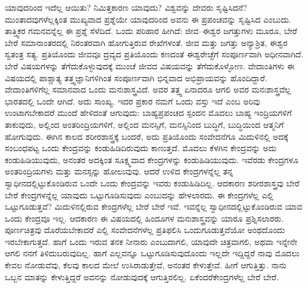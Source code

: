ಯಾವುದರಿಂದ ಇದೆಲ್ಲ ಆಯಿತು? ನಿಮಿತ್ತಕಾರಣ ಯಾವುದು? ವಿಶ್ವವನ್ನು ದೇವರು ಸೃಷ್ಟಿಸಿದನೆ? ಮುಂತಾದವುಗಳೆಲ್ಲಕ್ಕಿಂತ ಮುಖ್ಯವಾದ ಪ್ರಶ್ನೆಯೇ ಯಾವುದರಿಂದ ಅವನು ಈ ಪ್ರಪಂಚವನ್ನು ಸೃಷ್ಟಿಸಿದ ಎಂಬುದು. ತಾತ್ತ್ವಿಕರ ಗಮನವನ್ನೆಲ್ಲ ಈ ಪ್ರಶ್ನೆ ಸೆಳೆದಿದೆ. ಒಂದು ಪರಿಹಾರ ಹೀಗಿದೆ: ಜೀವ–ಈಶ್ವರ ಜಗತ್ತುಗಳು ಮೂರೂ, ಬೇರೆ ಬೇರೆ ಸಮಾನಾಂತರದಲ್ಲಿ ನಿರಂತರವಾಗಿ ಹೋಗುತ್ತಿರುವ ರೇಖೆಗಳಂತೆ. ಜೀವ ಮತ್ತು ಜಗತ್ತು ಅನ್ಯಾಶ್ರಿತ, ಈಶ್ವರ ಸ್ವತಂತ್ರ ಸತ್ಯ. ಪ್ರತಿಯೊಂದು ಜೀವವೂ ದ್ರವ್ಯದ ಪ್ರತಿಯೊಂದು ಕಣದಂತೆ ಈಶ್ವರೇಚ್ಛೆಗೆ ಸಂಪೂರ್ಣವಾಗಿ ಅಧೀನವಾಗಿದೆ. ಬೇರೆ ವಿಷಯಗಳನ್ನು ತೆಗೆದುಕೊಳ್ಳುವುದಕ್ಕೆ ಮುಂಚೆ ಜೀವದ ವಿಷಯವನ್ನು ತೆಗೆದುಕೊಳ್ಳೋಣ. ವೇದಾಂತಿಗಳು ಈ ವಿಷಯದಲ್ಲಿ ಪಾಶ್ಚಾತ್ಯ ತತ್ತ್ವಜ್ಞಾನಿಗಳಿಗಿಂತ ಸಂಪೂರ್ಣವಾಗಿ ಭಿನ್ನವಾದ ಅಭಿಪ್ರಾಯವನ್ನು ಹೊಂದಿದ್ದಾರೆ. ವೇದಾಂತಿಗಳಿಗೆಲ್ಲ ಸಮಾನವಾದ ಒಂದು ಮನಃಶಾಸ್ತ್ರವಿದೆ. ಅವರ ತತ್ತ್ವ ಏನಾದರೂ ಆಗಲಿ ಅವರ ಮನಃಶಾಸ್ತ್ರವೆಲ್ಲ ಭಾರತದಲ್ಲಿ ಒಂದೇ ಆಗಿದೆ. ಅದು ಸಾಂಖ್ಯ. ಇದರ ಪ್ರಕಾರ ನಮಗೆ ಒಂದು ವಸ್ತು ಇದೆ ಎಂಬ ಅರಿವು ಉಂಟಾಗಬೇಕಾದರೆ ಮುಂದೆ ಹೇಳಿದಂತೆ ಆಗುವುದು: ಬಾಹ್ಯಪ್ರಪಂಚದ ಸ್ಪಂದನ ಮೊದಲು ಬಾಹ್ಯ ಇಂದ್ರಿಯಗಳಿಗೆ ತಾಕುವುದು, ಅಲ್ಲಿಂದ ಅಂತರಿಂದ್ರಿಯಗಳಿಗೆ, ಅಲ್ಲಿಂದ ಮನಸ್ಸಿಗೆ, ಮನಸ್ಸಿನಿಂದ ಬುದ್ಧಿಗೆ, ಬುದ್ಧಿಯಿಂದ ಆತ್ಮನಿಗೆ ಹೋಗುವುದು. ಈಗಿನ ಕಾಲದ ಶರೀರಶಾಸ್ತ್ರಕ್ಕೆ ಬಂದರೆ, ಅದು ಪ್ರತಿಯೊಂದು ಸಂವೇದನೆಗೂ ಮಿದುಳಿನಲ್ಲಿ ಅದಕ್ಕೆ ಸಂಬಂಧಪಟ್ಟ ಒಂದು ಕೇಂದ್ರವನ್ನು ಕಂಡುಹಿಡಿದಿರುವುದು ಕಾಣುತ್ತದೆ. ಮೊದಲು ಕೆಳಗಿನ ಕೇಂದ್ರವನ್ನು ಅದು ಕಂಡುಹಿಡಿಯುವುದು, ಅನಂತರ ಅದಕ್ಕಿಂತ ಸೂಕ್ಷ್ಮವಾದ ಕೇಂದ್ರಗಳನ್ನು ಕಂಡುಹಿಡಿಯುವುದು. ಇವೆರಡು ಕೇಂದ್ರಗಳೂ ಅಂತರಿಂದ್ರಿಯಗಳು ಮತ್ತು ಮನಸ್ಸನ್ನು ಹೋಲುವುವು. ಆದರೆ ಉಳಿದ ಕೇಂದ್ರಗಳನ್ನೆಲ್ಲ ತನ್ನ ಸ್ವಾಧೀನದಲ್ಲಿಟ್ಟುಕೊಂಡಿರುವ ಒಂದೇ ಒಂದು ಕೇಂದ್ರವನ್ನು ಇವರು ಕಂಡುಹಿಡಿದಿಲ್ಲ. ಆದಕಾರಣ ಶರೀರಶಾಸ್ತ್ರವು ಬೇರೆ ಬೇರೆ ಕೇಂದ್ರಗಳನ್ನೆಲ್ಲ ಯಾವುದು ಒಟ್ಟುಗೂಡಿಸುವುದು ಎಂಬುದನ್ನು ಹೇಳಲಾರದು. ಈ ಕೇಂದ್ರಗಳೆಲ್ಲ ಎಲ್ಲಿ ಒಟ್ಟುಗೂಡುತ್ತವೆ? ಮಿದುಳಿನಲ್ಲಿರುವ ಕೇಂದ್ರಗಳೆಲ್ಲ ಬೇರೆ ಬೇರೆ ಇವೆ. ಇವನ್ನೆಲ್ಲ ಸ್ವಾಧೀನದಲ್ಲಿಟ್ಟುಕೊಂಡಿರುವ ಯಾವ ಒಂದು ಕೇಂದ್ರವೂ ಇಲ್ಲ. ಆದಕಾರಣ ಈ ವಿಷಯದಲ್ಲಿ ಹಿಂದೂಗಳ ಮನಃಶಾಸ್ತ್ರವನ್ನು ಯಾರೂ ಪ್ರಶ್ನಿಸಲಾರರು. ಪೂರ್ಣಚಿತ್ರವು ದೊರೆಯಬೇಕಾದರೆ ಎಲ್ಲಿ ಸಂವೇದನೆಗಳೆಲ್ಲ ಪ್ರತಿಫಲಿಸಿ ಒಂದುಗೂಡುತ್ತವೆಯೋ ಅಂಥದೊಂದು ಇರಬೇಕಾಗುತ್ತದೆ. ಹಾಗೆ ಒಂದು ಇರುವ ತನಕ ನೀನಾರು ಎಂಬುದಾಗಲಿ, ಯಾವುದೇ ಚಿತ್ರವಾಗಲಿ, ಅಥವಾ ಇನ್ನೇನೇ ಆಗಲಿ ನನಗೆ ತಿಳಿದುಬರುವುದಿಲ್ಲ. ಹಾಗೆ ಎಲ್ಲವನ್ನೂ ಒಟ್ಟುಗೂಡಿಸುವುದೊಂದು ಇಲ್ಲದೇ ಇದ್ದಿದ್ದರೆ ನಾವು ಮೊದಲು ಕೇವಲ ನೋಡುವೆವು, ಕೆಲವು ಕಾಲದ ಮೇಲೆ ಉಸಿರಾಡುತ್ತೇವೆ, ಅನಂತರ ಕೇಳುತ್ತೇವೆ. ಹೀಗೆ ಆಗುತ್ತಿತ್ತು. ನಾನು ಒಬ್ಬನ ಮಾತನ್ನು ಕೇಳುತ್ತಿದ್ದರೆ ಅವನನ್ನು ನೋಡುವುದಕ್ಕೆ ಆಗುತ್ತಿರಲಿಲ್ಲ. ಏಕೆಂದರೆ\break ಕೇಂದ್ರಗಳೆಲ್ಲ ಬೇರೆ ಬೇರೆ.

